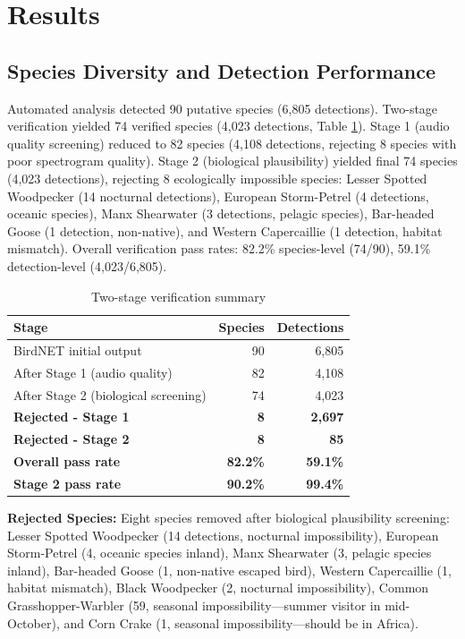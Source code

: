 \documentclass[twocolumn]{article}
\begin{document}
\section{Results}

\subsection{Species Diversity and Detection Performance}

Automated analysis detected 90 putative species (6,805 detections). Two-stage verification yielded 74 verified species (4,023 detections, Table \ref{tab:verification}). Stage 1 (audio quality screening) reduced to 82 species (4,108 detections, rejecting 8 species with poor spectrogram quality). Stage 2 (biological plausibility) yielded final 74 species (4,023 detections), rejecting 8 ecologically impossible species: Lesser Spotted Woodpecker (14 nocturnal detections), European Storm-Petrel (4 detections, oceanic species), Manx Shearwater (3 detections, pelagic species), Bar-headed Goose (1 detection, non-native), and Western Capercaillie (1 detection, habitat mismatch). Overall verification pass rates: 82.2\% species-level (74/90), 59.1\% detection-level (4,023/6,805).

\begin{table}[H]
\centering
\caption{Two-stage verification summary}
\label{tab:verification}
\begin{tabular}{lrr}
\toprule
\textbf{Stage} & \textbf{Species} & \textbf{Detections} \\
\midrule
BirdNET initial output & 90 & 6,805 \\
After Stage 1 (audio quality) & 82 & 4,108 \\
After Stage 2 (biological screening) & 74 & 4,023 \\
\midrule
\textbf{Rejected - Stage 1} & \textbf{8} & \textbf{2,697} \\
\textbf{Rejected - Stage 2} & \textbf{8} & \textbf{85} \\
\midrule
\textbf{Overall pass rate} & \textbf{82.2\%} & \textbf{59.1\%} \\
\textbf{Stage 2 pass rate} & \textbf{90.2\%} & \textbf{99.4\%} \\
\bottomrule
\end{tabular}
\end{table}

\textbf{Rejected Species:} Eight species removed after biological plausibility screening: Lesser Spotted Woodpecker (14 detections, nocturnal impossibility), European Storm-Petrel (4, oceanic species inland), Manx Shearwater (3, pelagic species inland), Bar-headed Goose (1, non-native escaped bird), Western Capercaillie (1, habitat mismatch), Black Woodpecker (2, nocturnal impossibility), Common Grasshopper-Warbler (59, seasonal impossibility—summer visitor in mid-October), and Corn Crake (1, seasonal impossibility—should be in Africa).
\end{document}
